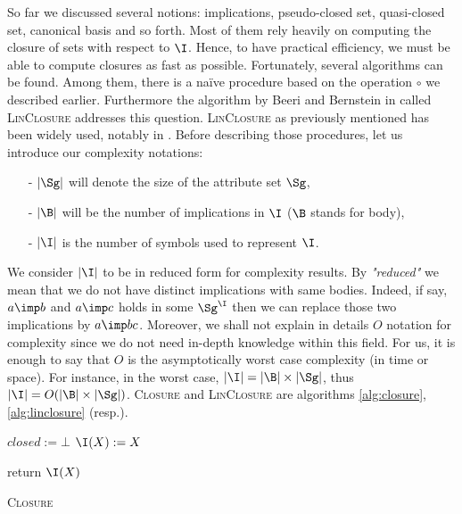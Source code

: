 \vspace{1.2em}


So far we discussed several notions: implications, pseudo-closed set, 
quasi-closed set, canonical basis and so forth. Most of them rely heavily on
computing the closure of sets with respect to $\I$. Hence, to have practical 
efficiency, we must be able to compute closures as fast as possible. 
Fortunately, several algorithms can be found. Among them, there is a naïve
procedure based on the operation $\circ$ we described earlier. Furthermore the 
algorithm by Beeri and Bernstein in \cite{beeri_computational_1979} called 
\textsc{LinClosure} addresses this question. \textsc{LinClosure} as previously 
mentioned has been widely used, notably in \cite{maier_theory_1983, 
maier_minimum_1980, ganter_conceptual_2016, shock_computing_1986, 
day_lattice_1992}. Before describing those procedures, let us introduce our 
complexity notations:
\begin{itemize}
	\item[-] $|\Sg|$ will denote the size of the attribute set $\Sg$,
	\item[-] $|\B|$ will be the number of implications in $\I$ ($\B$ stands
	for body),
	\item[-] $|\I|$ is the number of symbols used to represent $\I$.
\end{itemize}
We consider $|\I|$ to be in reduced form for complexity results. By \textit{"reduced"} we mean that we do not have distinct implications with same bodies. Indeed, if say, $a \imp b$ and $a \imp c$ holds in some $\Sg^{\I}$ then we can replace those two implications by $a \imp bc$. Moreover, we shall not explain in details $O$ notation for complexity since we do not need in-depth knowledge within this field. For us, it is enough to say that $O$ is the 
asymptotically worst case complexity (in time or space). For instance, in the 
worst case, $|\I| = |\B|\times|\Sg|$, thus $|\I| = O(|\B|\times|\Sg|)$. 
\textsc{Closure} and \textsc{LinClosure} are algorithms \ref{alg:closure}, 
\ref{alg:linclosure} (resp.). 

\vspace{1.2em}

\begin{algorithm}[ht]

\BlankLine
\BlankLine

$closed := \bot$ \;
$\I(X) := X$ \;

\BlankLine

return $\I(X)$\;

\caption{\textsc{Closure}}
\label{alg:closure}
\end{algorithm}


